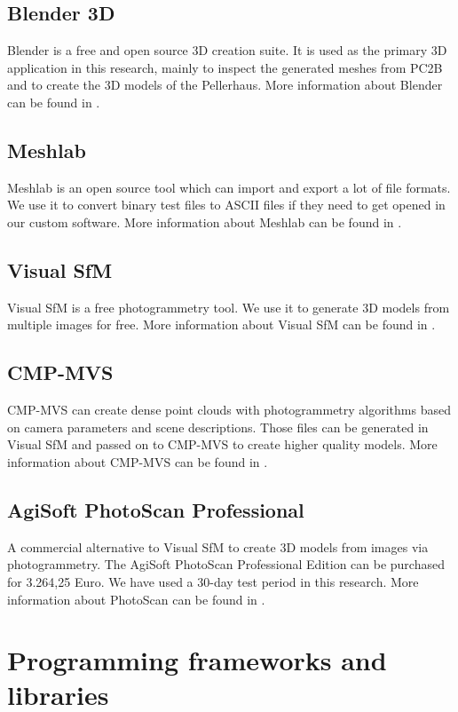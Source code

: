\subsection{Blender 3D}
Blender is a free and open source 3D creation suite. It is used as the primary 3D application in this research, mainly to inspect the generated meshes from PC2B and to create the 3D models of the Pellerhaus. More information about Blender can be found in \parencite{appendix_blender}.

\subsection{Meshlab}
Meshlab is an open source tool which can import and export a lot of file formats. We use it to convert binary test files to ASCII files if they need to get opened in our custom software. More information about Meshlab can be found in \parencite{appendix_meshlab}.

\subsection{Visual SfM}
\label{appendix_visual_sfm}
Visual SfM is a free photogrammetry tool. We use it to generate 3D models from multiple images for free. More information about Visual SfM can be found in \parencite{appendix_visualsfm}.

\subsection{CMP-MVS}
CMP-MVS can create dense point clouds with photogrammetry algorithms based on camera parameters and scene descriptions. Those files can be generated in Visual SfM and passed on to CMP-MVS to create higher quality models. More information about CMP-MVS can be found in \parencite{appendix_cmp-mvs}.

\subsection{AgiSoft PhotoScan Professional}
A commercial alternative to Visual SfM to create 3D models from images via photogrammetry. The AgiSoft PhotoScan Professional Edition can be purchased for 3.264,25 Euro. We have used a 30-day test period in this research. More information about PhotoScan can be found in \parencite{appendix_agisoft_photoscan}.


\section{Programming frameworks and libraries}

